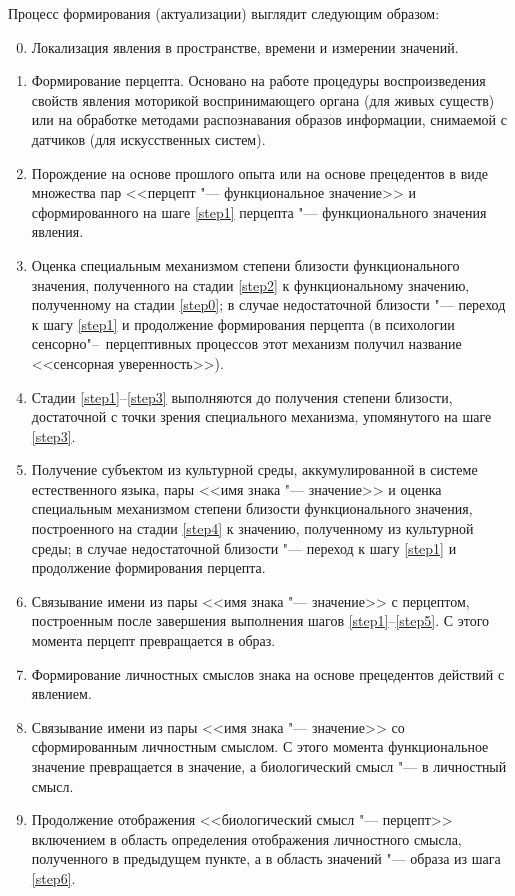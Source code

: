 Процесс формирования (актуализации) выглядит следующим образом:
\begin{enumerate}
	\setcounter{enumi}{-1}
	\renewcommand\labelenumi{\theenumi.}
	\item\label{step0} Локализация явления в пространстве, времени и измерении значений.
	\item\label{step1} Формирование перцепта. Основано на работе процедуры воспроизведения свойств явления моторикой воспринимающего органа (для живых существ) или на обработке методами распознавания образов информации, снимаемой с датчиков (для искусственных систем).
	\item\label{step2} Порождение на основе прошлого опыта или на основе прецедентов в виде множества пар <<перцепт "--- функциональное значение>> и сформированного на шаге \ref{step1} перцепта "--- функционального значения явления.
	\item\label{step3} Оценка специальным механизмом степени близости функционального значения, полученного на стадии \ref{step2} к функциональному значению, полученному на стадии \ref{step0}; в случае недостаточной близости "--- переход к шагу \ref{step1} и продолжение формирования перцепта (в психологии сенсорно"--~перцептивных процессов этот механизм получил название <<сенсорная уверенность>>).
	\item\label{step4} Стадии \ref{step1}--\ref{step3} выполняются до получения степени близости, достаточной с точки зрения специального механизма, упомянутого на шаге \ref{step3}.
	\item\label{step5} Получение субъектом из культурной среды, аккумулированной в системе естественного языка, пары <<имя знака "--- значение>> и оценка специальным механизмом степени близости функционального значения, построенного на стадии \ref{step4} к значению, полученному из культурной среды; в случае недостаточной близости "--- переход к шагу \ref{step1} и продолжение формирования перцепта.
	\item\label{step6} Связывание имени из пары <<имя знака "--- значение>> с перцептом, построенным после завершения выполнения шагов \ref{step1}--\ref{step5}. С этого момента перцепт превращается в образ.
	\item Формирование личностных смыслов знака на основе прецедентов действий с явлением.
	\item Связывание имени из пары <<имя знака "--- значение>> со сформированным личностным смыслом. С этого момента функциональное значение превращается в значение, а биологический смысл "--- в личностный смысл.
	\item Продолжение отображения <<биологический смысл "--- перцепт>> включением в область определения отображения личностного смысла, полученного в предыдущем пункте, а в область значений "--- образа из шага \ref{step6}.
\end{enumerate}

